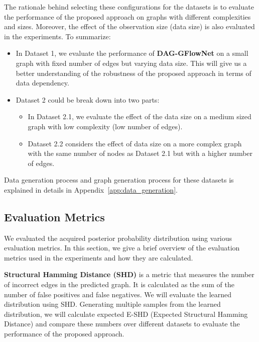 \documentclass{lxaiproposal}
\begin{document}
    The rationale behind selecting these configurations for the datasets is to evaluate the performance of the proposed
    approach on graphs with different complexities and sizes. Moreover, the effect of the observation size (data
    size) is also evaluated in the experiments. To summarize:
    \begin{itemize}
        \item In Dataset 1, we evaluate the performance of \textbf{DAG-GFlowNet} on a small graph with fixed number
        of edges but varying data size. This will give us a better understanding of the robustness of the proposed
        approach in terms of data dependency.
        \item Dataset 2 could be break down into two parts:
        \begin{itemize}
            \item In Dataset 2.1, we evaluate the effect of the data size on a medium sized graph with low complexity (low number of edges).
            \item Dataset 2.2 considers the effect of data size on a more complex graph with the same number of
            nodes as Dataset 2.1 but with a higher number of edges.
        \end{itemize}
    \end{itemize}

    Data generation process and graph generation process for these datasets is explained in details in Appendix~\ref{app:data_generation}.

    \subsection{Evaluation Metrics}
    \vspace*{-3mm}

    We evaluated the acquired posterior probability distribution
     using various evaluation metrics. In this
    section, we give a brief overview of the evaluation metrics used in the experiments and how they are calculated.

    \vspace*{3mm}
    \noindent\textbf{Structural Hamming Distance (SHD)} is a metric that measures the number of incorrect edges in the
    predicted graph. It is calculated as the sum of the number of false positives and false negatives. We will
    evaluate the learned distribution using SHD. Generating multiple samples from the learned distribution,
    we will calculate expected E-SHD (Expected Structural Hamming Distance) and compare these numbers over different
    datasets to evaluate the performance of the proposed approach.
\end{document}
